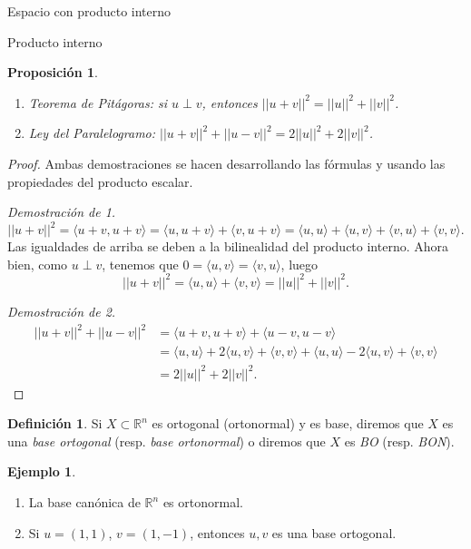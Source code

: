 \documentclass[a4paper,12pt,twoside,spanish,reqno]{amsbook}
\newtheorem{proposicion}[teorema]{Proposici\'on}
\theoremstyle{definition}
\newtheorem{definicion}{Definici\'on}[section]
\newtheorem{ejemplo}{Ejemplo}[section]
\theoremstyle{remark}
\newcommand{\la}{\langle}
\newcommand{\ra}{\rangle}
\newcommand{\R}{\mathbb R}
\begin{document}
\begin{chapter}{Espacio con producto interno}
\begin{section}{Producto interno}
		
		
		\begin{proposicion}
			${}^{}$
			\begin{enumerate}
				\item Teorema de Pitágoras: si $u\perp v$, entonces $||u+v||^2 = ||u||^2 + ||v||^2$.
				\item Ley del Paralelogramo: $||u+v||^2+ ||u-v||^2 = 2||u||^2 + 2||v||^2$.
			\end{enumerate}
		\end{proposicion}
		\begin{proof} Ambas demostraciones se hacen desarrollando las fórmulas y usando las propiedades del producto escalar.
			
			\textit{Demostración de 1.}
			\begin{equation*}
			||u+v||^2 = \la u+v, u+v\ra = \la u, u+v\ra+\la v, u+v\ra = \la u, u\ra+\la u, v\ra+\la v, u\ra+\la v, v\ra.
			\end{equation*} 
			Las igualdades de arriba se deben a la bilinealidad del producto interno. 
			Ahora bien,  como $u\perp v$,  tenemos que $0 = \la u, v\ra=\la v, u\ra$, luego
			\begin{equation*}
			||u+v||^2 = \la u, u\ra+ \la v, v\ra =  ||u||^2 + ||v||^2.
			\end{equation*} 
			
			\textit{Demostración de 2.}
			\begin{align*}
			||u+v||^2+ ||u-v||^2 &= \la u+v, u+v\ra + \la u-v, u-v\ra \\
			&= \la u, u\ra+2\la u, v\ra+\la v, v\ra + \la u, u\ra-2\la u, v\ra+\la v, v\ra \\
			&=  2||u||^2 + 2||v||^2.
			\end{align*}
		\end{proof}
		
		\begin{definicion} Si $X \subset \R^n$ es ortogonal (ortonormal) y es base, diremos que $X$ es una \emph{base ortogonal} (resp. \emph{base ortonormal}) o diremos que $X$ es \textit{BO} (resp. \textit{BON}).
		\end{definicion}
		
		\begin{ejemplo} ${}^{}$
			\begin{enumerate}
				\item La base canónica de $\R^n$ es ortonormal. 
				\item Si $u=(1,1)$, $v=(1,-1)$, entonces $u,v$ es una base ortogonal.  
			\end{enumerate}
		\end{ejemplo}
		

\end{section}
\end{chapter}
\end{document}
